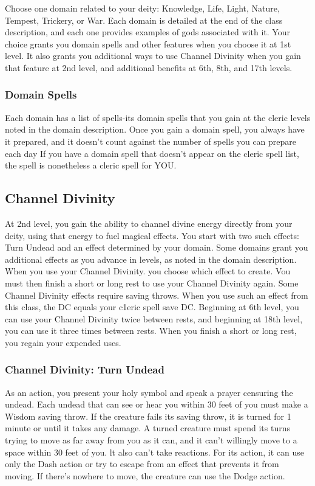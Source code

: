 \documentclass[letterpaper,10pt,twoside,twocolumn,openany]{book}
\begin{document}
Choose one domain related to your deity: Knowledge, Life, Light, Nature, Tempest, Trickery, or War. Each domain is detailed at the end of the class description, and each one provides examples of gods associated with it. Your choice grants you domain spells and other features when you choose it at 1st level. It also grants you additional ways to use Channel Divinity when you gain that feature at 2nd level, and additional benefits at 6th, 8th, and 17th levels.

\subsubsection{Domain Spells}

Each domain has a list of spells-its domain spells that you gain at the cleric levels noted in the domain description. Once you gain a domain spell, you always have it prepared, and it doesn't count against the number of spells you can prepare each day If you have a domain spell that doesn't appear on the cleric spell list, the spell is nonetheless a cleric spell for YOU.

\subsection{Channel Divinity}

At 2nd level, you gain the ability to channel divine energy directly from your deity, using that energy to fuel magical effects. You start with two such effects: Turn Undead and an effect determined by your domain. Some domains grant you additional effects as you advance in levels, as noted in the domain description. When you use your Channel Divinity. you choose which effect to create. Vou must then finish a short or long rest to use your Channel Divinity again. Some Channel Divinity effects require saving throws. When you use such an effect from this class, the DC equals your c1eric spell save DC. Beginning at 6th level, you can use your Channel Divinity twice between rests, and beginning at 18th level, you can use it three times between rests. When you finish a short or long rest, you regain your expended uses.

\subsubsection{Channel Divinity: Turn Undead}

As an action, you present your holy symbol and speak a prayer censuring the undead. Each undead that can see or hear you within 30 feet of you must make a Wisdom saving throw. If the creature fails its saving throw, it is turned for 1 minute or until it takes any damage. A turned creature must spend its turns trying to move as far away from you as it can, and it can't willingly move to a space within 30 feet of you. lt also can't take reactions. For its action, it can use only the Dash action or try to escape from an effect that prevents it from moving. If there's nowhere to move, the creature can use the Dodge action.
\end{document}
